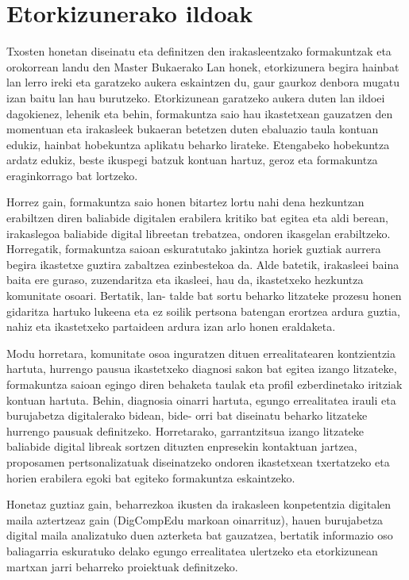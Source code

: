 \chapter{Etorkizunerako ildoak}\label{cha:etorkizuna}

Txosten honetan diseinatu eta definitzen den irakasleentzako formakuntzak eta orokorrean landu den Master Bukaerako Lan honek, etorkizunera begira hainbat lan lerro ireki eta garatzeko aukera eskaintzen du, gaur gaurkoz denbora mugatu izan baitu lan hau burutzeko. Etorkizunean garatzeko aukera duten lan ildoei dagokienez, lehenik eta behin, formakuntza saio hau ikastetxean gauzatzen den momentuan eta irakasleek bukaeran betetzen duten ebaluazio taula kontuan edukiz, hainbat hobekuntza aplikatu beharko lirateke. Etengabeko hobekuntza ardatz edukiz, beste ikuspegi batzuk kontuan hartuz, geroz eta formakuntza eraginkorrago bat lortzeko.

Horrez gain, formakuntza saio honen bitartez lortu nahi dena hezkuntzan erabiltzen diren baliabide digitalen erabilera kritiko bat egitea eta aldi berean, irakaslegoa baliabide digital libreetan trebatzea, ondoren ikasgelan erabiltzeko. Horregatik, formakuntza saioan eskuratutako jakintza horiek guztiak aurrera begira ikastetxe guztira zabaltzea ezinbestekoa da. Alde batetik, irakasleei baina baita ere guraso, zuzendaritza eta ikasleei, hau da, ikastetxeko hezkuntza komunitate osoari.
Bertatik, lan- talde bat sortu beharko litzateke prozesu honen gidaritza hartuko lukeena eta ez soilik pertsona batengan erortzea ardura guztia, nahiz eta ikastetxeko partaideen ardura izan arlo honen eraldaketa.

Modu horretara, komunitate osoa inguratzen dituen errealitatearen kontzientzia hartuta, hurrengo pausua ikastetxeko diagnosi sakon bat egitea izango litzateke, formakuntza saioan egingo diren behaketa taulak eta profil ezberdinetako iritziak kontuan hartuta. Behin, diagnosia oinarri hartuta, egungo errealitatea irauli eta burujabetza digitalerako bidean, bide- orri bat diseinatu beharko litzateke hurrengo pausuak definitzeko. Horretarako, garrantzitsua izango litzateke baliabide digital libreak sortzen dituzten enpresekin kontaktuan jartzea, proposamen pertsonalizatuak diseinatzeko ondoren ikastetxean txertatzeko eta horien erabilera egoki bat egiteko formakuntza eskaintzeko.

Honetaz guztiaz gain, beharrezkoa ikusten da irakasleen konpetentzia digitalen maila aztertzeaz gain (DigCompEdu markoan oinarrituz), hauen burujabetza digital maila analizatuko duen azterketa bat gauzatzea, bertatik informazio oso baliagarria eskuratuko delako egungo errealitatea ulertzeko eta etorkizunean martxan jarri beharreko proiektuak definitzeko.
